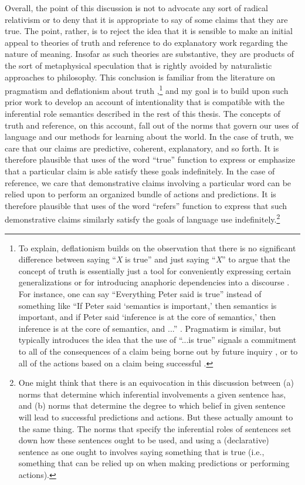 Overall, the point of this discussion is not to advocate any sort of radical relativism or to deny that it is appropriate to say of some claims that they are true. The point, rather, is to reject the idea that it is sensible to make an initial appeal to theories of truth and reference to do explanatory work regarding the nature of meaning. Insofar as such theories are substantive, they are products of the sort of metaphysical speculation that is rightly avoided by naturalistic approaches to philosophy. This conclusion is familiar from the literature on pragmatism and deflationism about truth \citep[see, e.g.][]{Brandom:2000,Brandom:2009,Brandom:1994,Misak:2013,Misak:2007,Horwich:2005},\footnote{To explain, deflationism builds on the observation that there is no significant difference between saying ``\textit{X} is true'' and just saying ``\textit{X}'' to argue that the concept of truth is essentially just a tool for conveniently expressing certain generalizations \citep{Horwich:2005} or for introducing anaphoric dependencies into a discourse \citep{Brandom:1994,Brandom:2009}. For instance, one can say ``Everything Peter said is true'' instead of something like ``If Peter said `semantics is important,' then semantics is important, and if Peter said `inference is at the core of semantics,' then inference is at the core of semantics, and ...'' \citep{Horwich:2005}. Pragmatism is similar, but typically introduces the idea that the use of ``...is true'' signals a commitment to all of the consequences of a claim being borne out by future inquiry \citep{Misak:2007,Misak:2013,Peirce:1992}, or to all of the actions based on a claim being successful \citep{Whyte:1990}.} and my goal is to build upon such prior work to develop an account of intentionality that is compatible with the inferential role semantics described in the rest of this thesis. The concepts of truth and reference, on this account, fall out of the norms that govern our uses of language and our methods for learning about the world. In the case of truth, we care that our claims are predictive, coherent, explanatory, and so forth. It is therefore plausible that uses of the word ``true'' function to express or emphasize that a particular claim is able satisfy these goals indefinitely. In the case of reference, we care that demonstrative claims involving a particular word can be relied upon to perform an organized bundle of actions and predictions. It is therefore plausible that uses of the word ``refers'' function to express that such demonstrative claims similarly satisfy the goals of language use indefinitely.\footnote{One might think that there is an equivocation in this discussion between (a) norms that determine which inferential involvements a given sentence has, and (b) norms that determine the degree to which belief in given sentence will lead to successful predictions and actions. But these actually amount to the same thing. The norms that specify the inferential roles of sentences set down how these sentences ought to be used, and using a (declarative) sentence as one ought to involves saying something that is true (i.e., something that can be relied up on when making predictions or performing actions).}

